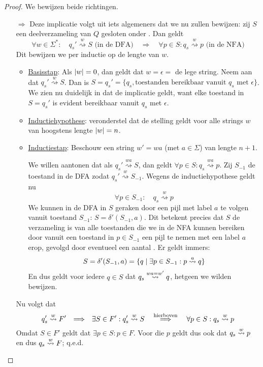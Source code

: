 \documentclass[../aanvullingen_cursus.tex]{subfiles}
\begin{document}
\begin{proof}
	We bewijzen beide richtingen.
	\begin{enumerate}
		\item[\( \Rightarrow \)] Deze implicatie volgt uit iets algemeners dat we nu zullen bewijzen: zij \(S\) een deelverzameling van \( Q \) gesloten onder \epsilonbogen. Dan geldt \[ \forall w \in \Sigma^*: \quad q_{s}' \overset{w}{\rightsquigarrow} S \text{ (in de DFA)} \quad \Longrightarrow \quad \forall p \in S: q_s \overset{w}{\rightsquigarrow} p \text{ (in de NFA)}  \] Dit bewijzen we per inductie op de lengte van \( w \).
		\begin{itemize}
			\item \underline{Basisstap}: Als \(\lvert w \rvert=0\), dan geldt dat \(w = \epsilon = \) de lege string. Neem aan dat \(q_{s}' \overset{w}{\rightsquigarrow} S\). Dan is \(S=q_s'=\{q_s, \text{toestanden bereikbaar vanuit }q_s \text{ met }\epsilon\}\). We zien nu duidelijk in dat de implicatie geldt, want elke toestand in \(S=q_s'\) is evident bereikbaar vanuit \(q_s\) met \(\epsilon\).
			\item \underline{Inductiehypothese}: veronderstel dat de stelling geldt voor alle strings \(w\) van hoogstens lengte \(\lvert w \rvert=n\).
			\item \underline{Inductiestap}: Beschouw een string \(w' = wa \) (met \(a \in \Sigma\)) van lengte \(n+1\).

			We willen aantonen dat als \(q_{s}' \overset{wa}{\rightsquigarrow} S\), dan geldt \(\forall p \in S: q_s \overset{wa}{\rightsquigarrow} p\). Zij \(S_{-1}\) de toestand in de DFA zodat \(q_{s}' \overset{w}{\rightsquigarrow} S_{-1}\). Wegens de inductiehypothese geldt nu \[ \forall p\in S_{-1}: \quad q_s \overset{w}{\rightsquigarrow} p\]We kunnen in de DFA in \(S\) geraken door een pijl met label \(a\) te volgen vanuit toestand \(S_{-1}\): \(S = \delta'(S_{-1},a)\). Dit betekent precies dat \(S\) de verzameling is van alle toestanden die we in de NFA kunnen bereiken door vanuit een toestand in \(p \in S_{-1}\) een pijl te nemen met een label \(a\) erop, gevolgd door eventueel een aantal \epsilonbogen. Er geldt immers: \[S=\delta'(S_{-1},a)=\{q \mid \exists p \in S_{-1}: p \overset{a}{\rightsquigarrow} q\}\] En dus geldt voor iedere \(q \in S\) dat \(q_s \overset{wa=w'}{\rightsquigarrow} q \), hetgeen we wilden bewijzen.
		\end{itemize}

		Nu volgt dat \[q_s'\overset{w}{\rightsquigarrow}F' \quad {\Longrightarrow} \quad \exists S \in F': q_s' \overset{w}{\rightsquigarrow} S \quad \overset{\text{hierboven}}{\Longrightarrow} \quad \forall p \in S: q_s \overset{w}{\rightsquigarrow} p\]
		Omdat \(S\in F'\) geldt dat \(\exists p \in S : p \in F\). Voor die \(p\) geldt dus ook dat \(q_s \overset{w}{\rightsquigarrow} p\) en dus \(q_s \overset{w}{\rightsquigarrow} F\); q.e.d.


\end{enumerate}
\end{proof}
\end{document}
